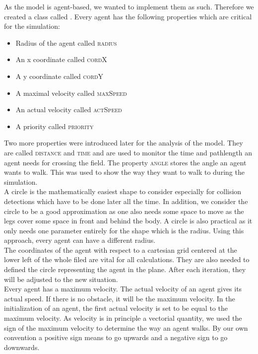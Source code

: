 
As the model is agent-based, we wanted to implement them as such. Therefore we created a class called . Every agent has the following properties which are critical for the simulation:
\begin{itemize}
	\item Radius of the agent called \textsc{radius}
	\item An x coordinate called \textsc{cordX}
	\item A y coordinate called \textsc{cordY}
	\item A maximal velocity called \textsc{maxSpeed}
	\item An actual velocity called \textsc{actSpeed}
	\item A priority called \textsc{priority}
\end{itemize}
\noi Two more properties were introduced later for the analysis of the model. They are called \textsc{distance} and \textsc{time} and are used to monitor the time and pathlength an agent needs for crossing the field. The property \textsc{angle} stores the angle an agent wants to walk. This was used to show the way they want to walk to during the simulation.\\

\noi A circle is the mathematically easiest shape to consider especially for collision detections which have to be done later all the time. In addition, we consider the circle to be a good approximation as one also needs some space to move as the legs cover some space in front and behind the body. A circle is also practical as it only needs one parameter entirely for the shape which is the radius. Using this approach, every agent can have a different radius.\\

\noi The coordinates of the agent with respect to a cartesian grid centered at the lower left of the whole filed are vital for all calculations. They are also needed to defined the circle representing the agent in the plane. After each iteration, they will be adjusted to the new situation.\\

\noi Every agent has a maximum velocity. The actual velocity of an agent gives its actual speed. If there is no obstacle, it will be the maximum velocity. In the initialization of an agent, the first actual velocity is set to be equal to the maximum velocity. As velocity is in principle a vectorial quantity, we used the sign of the maximum velocity to determine the way an agent walks. By our own convention a positive sign means to go upwards and a negative sign to go downwards.\\

